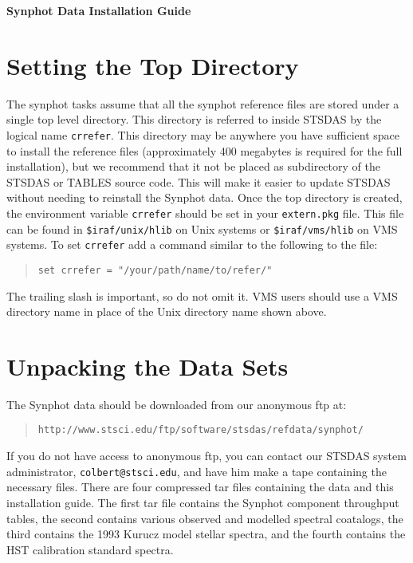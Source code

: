 \documentclass{article}
\begin{document}
\pagestyle{plain}

\begin{center}
{\LARGE \bf Synphot Data Installation Guide}
\end{center}

\vspace{6ex}

\section{Setting the Top Directory}

The synphot tasks assume that all the synphot reference files are
stored under a single top level directory. This directory is referred
to inside STSDAS by the logical name {\tt crrefer}. This directory
may be anywhere you have sufficient space to install the reference
files (approximately 400 megabytes is required for the full
installation), but we recommend that it not be placed as subdirectory
of the STSDAS or TABLES source code. This will make it easier to
update STSDAS without needing to reinstall the Synphot data. Once the
top directory is created, the environment variable {\tt crrefer}
should be set in your {\tt extern.pkg} file. This file can be found in
{\tt \$iraf/unix/hlib} on Unix systems or {\tt \$iraf/vms/hlib} on VMS
systems. To set {\tt crrefer} add a command similar to the following
to the file:

\begin{quote}\begin{verbatim}
set crrefer = "/your/path/name/to/refer/"
\end{verbatim}\end{quote}

The trailing slash is important, so do not omit it. VMS users should
use a VMS directory name in place of the Unix directory name shown
above.

\section{Unpacking the Data Sets}

The Synphot data should be downloaded from our anonymous ftp at:

\begin{quote}\begin{verbatim}
http://www.stsci.edu/ftp/software/stsdas/refdata/synphot/ 
\end{verbatim}\end{quote}

If you do not have access to anonymous ftp, you can contact our STSDAS
system administrator, {\tt colbert@stsci.edu}, and have him make a
tape containing the necessary files. There are four compressed tar
files containing the data and this installation guide. The first tar
file contains the Synphot component throughput tables, the second
contains various observed and modelled spectral coatalogs, the
third contains the 1993 Kurucz model stellar spectra, and the fourth
contains the HST calibration standard spectra.
\end{document}
